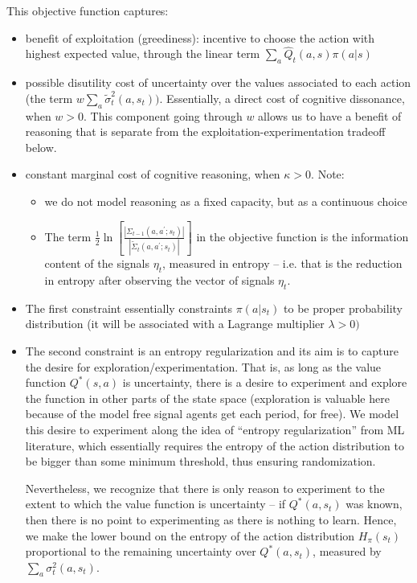 \documentclass[12pt]{article}%
\begin{document}
This objective function captures:

\begin{itemize}
\item benefit of exploitation (greediness): incentive to choose the action
with highest expected value, through the linear term $\sum_{a}\widehat{Q}%
_{t}(a,s)\pi(a|s)$

\item possible disutility cost of uncertainty over the values associated to
each action (the term $w \sum_{a} \widetilde\sigma_{t}^{2}(a,s_{t}))$.
Essentially, a direct cost of cognitive dissonance, when $w>0.$ This component
going through $w$ allows us to have a benefit of reasoning that is separate
from the exploitation-experimentation tradeoff below.

\item constant marginal cost of cognitive reasoning, when $\kappa>0.$ Note:

\begin{itemize}
\item we do not model reasoning as a fixed capacity, but as a continuous choice

\item The term $\frac{1}{2} \ln\left[  \frac{|\Sigma_{t-1}(a,a^{\prime}%
;s_{t})|}{|\widetilde\Sigma_{t}(a,a^{\prime};s_{t} )|}\right] $ in the
objective function is the information content of the signals $\eta_{t}$,
measured in entropy -- i.e. that is the reduction in entropy after observing
the vector of signals $\eta_{t}$.
\end{itemize}

\item The first constraint essentially constraints $\pi(a|s_{t})$ to be proper
probability distribution (it will be associated with a Lagrange multiplier
$\lambda>0)$

\item The second constraint is an entropy regularization and its aim is to
capture the desire for exploration/experimentation. That is, as long as the
value function $Q^{*}(s,a)$ is uncertainty, there is a desire to experiment
and explore the function in other parts of the state space (exploration is
valuable here because of the model free signal agents get each period, for
free). We model this desire to experiment along the idea of ``entropy
regularization'' from ML literature, which essentially requires the entropy of
the action distribution to be bigger than some minimum threshold, thus
ensuring randomization.

Nevertheless, we recognize that there is only reason to experiment to the
extent to which the value function is uncertainty -- if $Q^{*}(a,s_{t})$ was
known, then there is no point to experimenting as there is nothing to learn.
Hence, we make the lower bound on the entropy of the action distribution
$H_{\pi}(s_{t})$ proportional to the remaining uncertainty over $Q^{*}%
(a,s_{t})$, measured by $\sum_{a}\sigma_{t}^{2}(a,s_{t})$.
\end{itemize}
\end{document}

